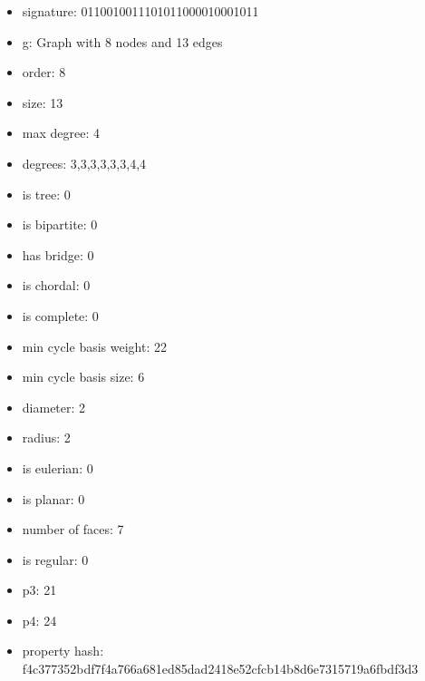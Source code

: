 \begin{itemize}
\item signature: 0110010011101011000010001011
\item g: Graph with 8 nodes and 13 edges
\item order: 8
\item size: 13
\item max degree: 4
\item degrees: 3,3,3,3,3,3,4,4
\item is tree: 0
\item is bipartite: 0
\item has bridge: 0
\item is chordal: 0
\item is complete: 0
\item min cycle basis weight: 22
\item min cycle basis size: 6
\item diameter: 2
\item radius: 2
\item is eulerian: 0
\item is planar: 0
\item number of faces: 7
\item is regular: 0
\item p3: 21
\item p4: 24
\item property hash: f4c377352bdf7f4a766a681ed85dad2418e52cfcb14b8d6e7315719a6fbdf3d3
\end{itemize}
\newpage
\begin{figure}
\end{figure}
